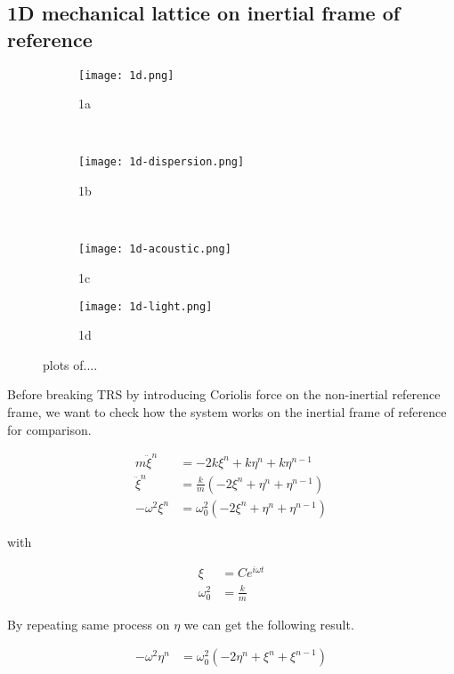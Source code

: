 \documentclass[../main.tex]{subfiles}
\begin{document}
\subsection{1D mechanical lattice on inertial frame of reference}

\begin{figure}
\begin{subfigure}{\textwidth}
  \centering
  \texttt{[image: 1d.png]}
  \caption{1a}
  \label{fig:1d}
\end{subfigure}\\
\begin{subfigure}{\textwidth}
  \centering
  \texttt{[image: 1d-dispersion.png]}
  \caption{1b}
  \label{fig:1d-dispersion}
\end{subfigure}\\
\begin{subfigure}{.3\textwidth}
  \centering
  \texttt{[image: 1d-acoustic.png]}
  \caption{1c}
  \label{fig:1d-acoustic}
\end{subfigure}
\begin{subfigure}{.3\textwidth}
  \centering
  \texttt{[image: 1d-light.png]}
  \caption{1d}
  \label{fig:1d-light}
\end{subfigure}
\caption{plots of....}
\label{fig:fig}
\end{figure}

Before breaking TRS by introducing Coriolis force on the non-inertial reference frame, we want to check how the system works on the inertial frame of reference for comparison.

\begin{align}
m\ddot\xi^n &= -2k\xi^n + k\eta^n + k\eta^{n-1}\\
\ddot\xi^n &= \frac{k}{m}(-2\xi^n + \eta^n + \eta^{n-1})\\
-\omega^2\xi^n &= \omega_0^2(-2\xi^n + \eta^n + \eta^{n-1})
\end{align}

with

\begin{align}
\xi &= C e^{i\omega t}\\
\omega_0^2 &= \frac{k}{m}
\end{align}

By repeating same process on $\eta$ we can get the following result.

\begin{align}
-\omega^2\eta^n &= \omega_0^2(-2\eta^n + \xi^n + \xi^{n-1})
\end{align}
\end{document}
